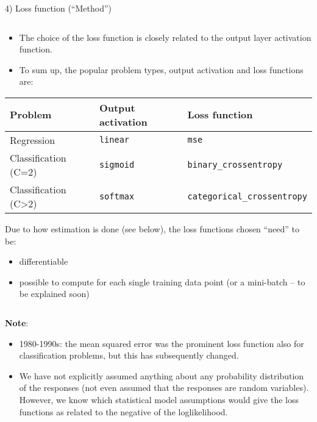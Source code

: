 \documentclass[10pt,ignorenonframetext,]{beamer}
\providecommand{\tightlist}{%
  \setlength{\itemsep}{0pt}\setlength{\parskip}{0pt}}
\begin{document}
\begin{frame}[fragile]

\begin{block}{4) Loss function (``Method'')}

\(~\)

\begin{itemize}
\item
  The choice of the loss function is closely related to the output layer
  activation function.
\item
  To sum up, the popular problem types, output activation and loss
  functions are:
\end{itemize}

\begin{longtable}[]{@{}lll@{}}
\toprule
Problem & Output activation & Loss function\tabularnewline
\midrule
\endhead
Regression & \texttt{linear} & \texttt{mse}\tabularnewline
Classification (C=2) & \texttt{sigmoid} &
\texttt{binary\_crossentropy}\tabularnewline
Classification (C\textgreater{}2) & \texttt{softmax} &
\texttt{categorical\_crossentropy}\tabularnewline
\bottomrule
\end{longtable}

\end{block}

\end{frame}

\begin{frame}

Due to how estimation is done (see below), the loss functions chosen
``need'' to be:

\begin{itemize}
\tightlist
\item
  differentiable
\item
  possible to compute for each single training data point (or a
  mini-batch -- to be explained soon)
\end{itemize}

\(~\)

\textbf{Note}:

\begin{itemize}
\item
  1980-1990s: the mean squared error was the prominent loss function
  also for classification problems, but this has subsequently changed.
\item
  We have not explicitly assumed anything about any probability
  distribution of the responses (not even assumed that the responses are
  random variables). However, we know which statistical model
  assumptions would give the loss functions as related to the negative
  of the loglikelihood.
\end{itemize}

\end{frame}
\end{document}
